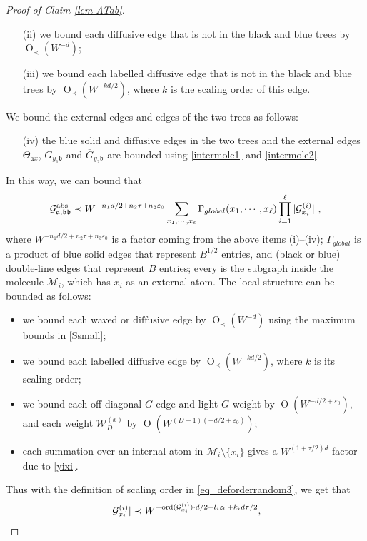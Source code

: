 \documentclass{article}
\newcommand{\1}{\mathds{1}}
\numberwithin{equation}{section}
\newcommand{\ord}{{\rm{ord}}}
\newcommand{\be}{\begin{equation}}
\newcommand{\ee}{\end{equation}}
\newcommand{\e}{{\varepsilon}}
\newcommand{\fa}{{\mathfrak a}}
\newcommand{\fb}{{\mathfrak b}}
\renewcommand{\cal}{\mathcal}
\newcommand{\dashed}{\text{diffusive}}
\DeclareMathOperator{\OO}{O}
\theoremstyle{plain} %
\theoremstyle{remark}
\begin{document}
\begin{proof}[Proof of Claim \ref{lem ATab}]
\begin{itemize}
	\item[(ii)] we bound each $\dashed$ edge that is not in the black and blue trees by $\OO_\prec(W^{-d})$;

	\item[(iii)] we bound each labelled $\dashed$ edge that is not in the black and blue trees by $\OO_\prec(W^{-kd/2})$, where $k$ is the scaling order of this edge.
\end{itemize}
We bound the external edges and edges of the two trees as follows:
\begin{itemize}
	\item[(iv)] the blue solid and $\dashed$ edges in the two trees and the external edges ${\Theta}_{ \fa x}$, $G_{y_1\fb}$ and $\overline G_{y_2\fb}$ are bounded using \eqref{intermole1} and \eqref{intermole2}.
\end{itemize}
In this way, we can bound that
\be\label{reduce Gaux0}
\cal G^{\rm abs}_{\fa,\fb\fb} \prec W^{-n_1 d/2 + n_2 \tau + n_3\e_0}\sum_{x_1, \cdots, x_\ell} \Gamma_{global}(x_1, \cdots, x_\ell) \prod_{i=1}^\ell |\cal G_{x_i}^{(i)}| \ ,
\ee
where $W^{-n_1 d/2+ n_2\tau + n_3\e_0}$ is a factor coming from the above items (i)--(iv); $\Gamma_{global}$ is a product of blue solid edges that represent $B^{1/2}$ entries, and (black or blue) double-line edges that represent $B$ entries; every \smash{$\cal G_{x_i}^{(i)}$} is the subgraph inside the molecule $\cal M_i$, which has $x_i$ as an external atom. The local structure \smash{$\cal G_{x_i}^{(i)}$} can be  bounded as follows:
\begin{itemize}
	\item we bound each waved or $\dashed$ edge by $\OO_\prec(W^{-d })$ using the maximum bounds in \eqref{Ssmall};
	\item we bound each labelled $\dashed$ edge by $\OO_\prec (W^{-kd/2 })$, where $k$ is its scaling order;
	\item we bound each off-diagonal $G$ edge and light $G$ weight by $\OO(W^{-d/2+\e_0})$, and each weight $\cal W^{(x)}_D$ by $\OO(W^{(D+1)(-d/2+\e_0)})$;
	\item each summation over an internal atom in $\cal M_i \setminus \{x_i\}$ gives a $W^{(1+\tau/2)d}$ factor due to \eqref{yixi}.
\end{itemize}
Thus with the definition of scaling order in \eqref{eq_deforderrandom3}, we get that
\begin{align}\label{internal struc1}
	|\cal G_{x_i}^{(i)}|\prec W^{-\ord(\cal G^{(i)}_{x_i}) \cdot d/2 + l_i \e_0 + k_{i} d \tau /2 },
\end{align}

\end{proof}
\end{document}
